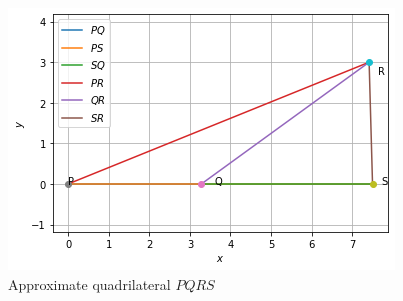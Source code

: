 \documentclass[journal,12pt,twocolumn]{IEEEtran}
\begin{document}
\begin{enumerate}
    \begin{figure}[!ht]
    \centering
    \includegraphics[width=\columnwidth]{Figure2}
    \caption{Approximate quadrilateral $PQRS$}
    \label{fig:quadrilateral}	
    \end{figure}
    
\end{enumerate}
\end{document}
